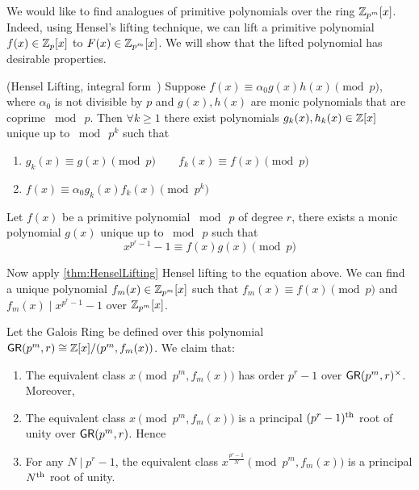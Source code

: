 We would like to find analogues of primitive polynomials over the ring \(\mathbb{Z}_{p^m}[x]\). Indeed, using Hensel's lifting technique, we can lift a primitive polynomial \(f(x) \in \mathbb{Z}_p[x]\) to \(F(x) \in \mathbb{Z}_{p^m}[x]\). We will show that the lifted polynomial has desirable properties.
\begin{theorem}{(Hensel Lifting, integral form~\cite{MISC:WikiHensel})} \label{thm:HenselLifting}
    Suppose \(f(x) \equiv \alpha_0 g(x) h(x) \pmod{p}\), where \(\alpha_0\) is not divisible by \(p\) and \(g(x), h(x)\) are monic polynomials that are coprime \(\bmod \  p\). Then \(\forall k \ge 1\) there exist polynomials \(g_k(x), h_k(x) \in \mathbb{Z}[x]\) unique up to \(\bmod \  p^k\) such that
    \begin{enumerate}
        \item \(g_k(x) \equiv g(x) \pmod{p} \qquad f_k(x) \equiv f(x) \pmod{p}\)
        \item \(f(x) \equiv \alpha_0 g_k(x) f_k(x) \pmod{p^k}\)
    \end{enumerate}
\end{theorem}
\begin{proposition} \label{prop:LiftedPrimPoly}
    Let \(f(x)\) be a primitive polynomial \(\bmod \  p\) of degree \(r\), there exists a monic polynomial \(g(x)\) unique up to \(\bmod \  p\) such that
    \[x^{p^r - 1} - 1 \equiv f(x) g(x) \pmod{p}\]

    Now apply \cref{thm:HenselLifting} Hensel lifting to the equation above. We can find a unique polynomial \(f_m(x) \in \mathbb{Z}_{p^m}[x]\) such that \(f_m(x) \equiv f(x) \pmod{p}\) and \(f_m(x) \mid x^{p^r - 1} - 1\) over \(\mathbb{Z}_{p^m}[x]\).

    Let the Galois Ring be defined over this polynomial \(\mathsf{GR}(p^m, r) \cong \mathbb{Z}[x] / (p^m, f_m(x))\). We claim that:
    \begin{enumerate}
        \item The equivalent class \(x \pmod{p^m, f_m(x)}\) has order \(p^r - 1\) over \(\mathsf{GR}(p^m, r)^{\times}\). Moreover,
        \item The equivalent class \(x \pmod{p^m, f_m(x)}\) is a principal \((p^r - 1)\textsuperscript{th}\) root of unity over \(\mathsf{GR}(p^m, r)\). Hence
        \item For any \(N \mid p^r - 1\), the equivalent class \(x^{\frac{p^r - 1}{N}} \pmod{p^m, f_m(x)}\) is a principal \(N\textsuperscript{th}\) root of unity.
    \end{enumerate}
\end{proposition}
